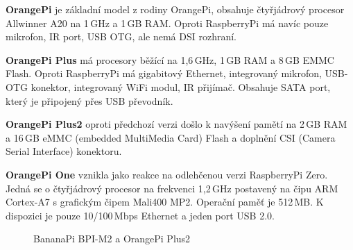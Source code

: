 		\textbf{OrangePi} je základní model z rodiny OrangePi, obsahuje čtyřjádrový procesor Allwinner A20 na 1\,GHz a 1\,GB RAM. Oproti RaspberryPi má navíc pouze mikrofon, IR port, USB OTG, ale nemá DSI rozhraní.
		
		\textbf{OrangePi Plus } má procesory běžící na 1,6\,GHz, 1\,GB RAM a 8\,GB EMMC Flash. Oproti RaspberryPi má gigabitový Ethernet, integrovaný mikrofon, USB-OTG konektor, integrovaný WiFi modul, IR přijímač. Obsahuje SATA port, který je připojený přes USB převodník.
		
		\textbf{OrangePi Plus2} oproti předchozí verzi došlo k navýšení pamětí na 2\,GB RAM a 16\,GB eMMC (embedded MultiMedia Card) Flash a doplnění CSI (Camera Serial Interface) konektoru.
		
		\textbf{OrangePi One} vznikla jako reakce na odlehčenou verzi RaspberryPi Zero. Jedná se o čtyřjádrový procesor na frekvenci 1,2\,GHz postavený na čipu ARM Cortex-A7 s grafickým čipem Mali400 MP2. Operační paměť je 512\,MB. K dispozici je pouze 10/100\,Mbps Ethernet a jeden port USB 2.0.

	\begin{figure}[!ht]
	\vspace{-10pt}
    \centering
			\hspace*{5mm}
			\caption{BananaPi BPI-M2 a OrangePi Plus2}
			\vspace{-10pt}	
\end{figure}
	
	

